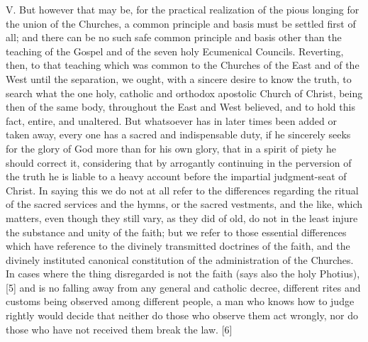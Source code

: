 V. But however that may be, for the practical realization of the pious
longing for the union of the Churches, a common principle and basis must
be settled first of all; and there can be no such safe common principle
and basis other than the teaching of the Gospel and of the seven holy
Ecumenical Councils. Reverting, then, to that teaching which was common
to the Churches of the East and of the West until the separation, we
ought, with a sincere desire to know the truth, to search what the one
holy, catholic and orthodox apostolic Church of Christ, being then
\textquotesingle of the same body,\textquotesingle{} throughout the East
and West believed, and to hold this fact, entire, and unaltered. But
whatsoever has in later times been added or taken away, every one has a
sacred and indispensable duty, if he sincerely seeks for the glory of
God more than for his own glory, that in a spirit of piety he should
correct it, considering that by arrogantly continuing in the perversion
of the truth he is liable to a heavy account before the impartial
judgment-seat of Christ. In saying this we do not at all refer to the
differences regarding the ritual of the sacred services and the hymns,
or the sacred vestments, and the like, which matters, even though they
still vary, as they did of old, do not in the least injure the substance
and unity of the faith; but we refer to those essential differences
which have reference to the divinely transmitted doctrines of the faith,
and the divinely instituted canonical constitution of the administration
of the Churches. \textquotesingle In cases where the thing disregarded
is not the faith (says also the holy Photius), {[}5{]} and is no falling
away from any general and catholic decree, different rites and customs
being observed among different people, a man who knows how to judge
rightly would decide that neither do those who observe them act wrongly,
nor do those who have not received them break the law.\textquotesingle{}
{[}6{]}

